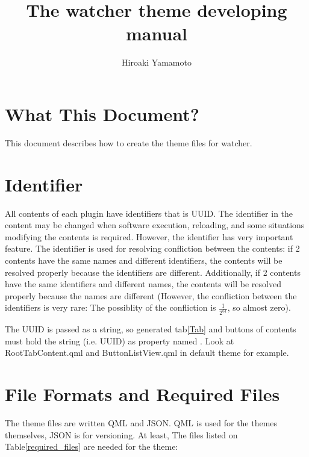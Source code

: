 \documentclass[titlepage]{article}
\title{The watcher theme developing manual}
\author{Hiroaki Yamamoto}
\begin{document}
    \maketitle
    \tableofcontents
    \clearpage
    \section{What This Document?}
        This document describes how to create the theme files for watcher.
        
    \section{Identifier}
        All contents of each plugin have identifiers that is UUID. The identifier in the content may be changed when software execution, reloading, 
        and some situations modifying the contents is required. However, the identifier has very important feature.
        The identifier is used for resolving confliction between the contents: if 2 contents have the same names and different identifiers,
        the contents will be resolved properly because the identifiers are different. Additionally, if 2 contents have the same identifiers
        and different names, the contents will be resolved properly because the names are different
        (However, the confliction between the identifiers is very rare: The possiblity of the confliction is $\frac{1}{2^{61}}$, so almost zero).
        
        The UUID is passed as a string, so generated tab\ref{Tab} and buttons of contents must hold the string (i.e. UUID) as property named \verb@uuid@.
        Look at RootTabContent.qml and ButtonListView.qml in default theme for example.
        
    \section{File Formats and Required Files}
        The theme files are written QML and JSON. QML is used for the themes themselves, JSON is for versioning.
        At least, The files listed on Table\ref{required_files} are needed for the theme:
        
\end{document}
